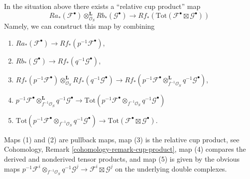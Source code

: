 \documentclass{stacks-project}
\theoremstyle{plain}
\theoremstyle{definition}
\theoremstyle{remark}
\numberwithin{equation}{subsection}
\begin{document}
\medskip\noindent
In the situation above there exists a ``relative cup product'' map
\begin{equation}
\label{equation-relative-de-rham-kunneth}
Ra_*(\mathcal{F}^\bullet)
\otimes_{\mathcal{O}_S}^\mathbf{L}
Rb_*(\mathcal{G}^\bullet)
\longrightarrow
Rf_*\left(\text{Tot}(\mathcal{F}^\bullet \boxtimes \mathcal{G}^\bullet)\right)
\end{equation}
Namely, we can construct this map by combining
\begin{enumerate}
\item $Ra_*(\mathcal{F}^\bullet) \to Rf_*(p^{-1}\mathcal{F}^\bullet)$,
\item $Rb_*(\mathcal{G}^\bullet) \to Rf_*(q^{-1}\mathcal{G}^\bullet)$,
\item
$Rf_*(p^{-1}\mathcal{F}^\bullet)
\otimes_{\mathcal{O}_S}^\mathbf{L}
Rf_*(q^{-1}\mathcal{G}^\bullet)
\to
Rf_*(p^{-1}\mathcal{F}^\bullet \otimes_{f^{-1}\mathcal{O}_S}^\mathbf{L}
q^{-1}\mathcal{G}^\bullet)$,
\item
$p^{-1}\mathcal{F}^\bullet \otimes_{f^{-1}\mathcal{O}_S}^\mathbf{L}
q^{-1}\mathcal{G}^\bullet \to
\text{Tot}(p^{-1}\mathcal{F}^\bullet \otimes_{f^{-1}\mathcal{O}_S}
q^{-1}\mathcal{G}^\bullet)$
\item
$\text{Tot}(p^{-1}\mathcal{F}^\bullet \otimes_{f^{-1}\mathcal{O}_S}
q^{-1}\mathcal{G}^\bullet) \to \text{Tot}(\mathcal{F}^\bullet \boxtimes
\mathcal{G}^\bullet)$.
\end{enumerate}
Maps (1) and (2) are pullback maps, map (3) is
the relative cup product, see
Cohomology, Remark \ref{cohomology-remark-cup-product},
map (4) compares the derived and nonderived tensor products, and
map (5) is given by the obvious maps
$p^{-1}\mathcal{F}^i \otimes_{f^{-1}\mathcal{O}_S} q^{-1}\mathcal{G}^j
\to \mathcal{F}^i \boxtimes \mathcal{G}^j$ on the underlying double complexes.
\end{document}
